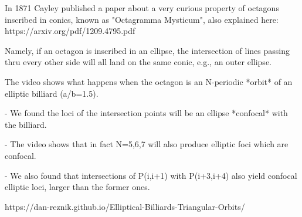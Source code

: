 In 1871 Cayley published a paper about a very curious property of octagons inscribed in conics, known as "Octagramma Mysticum", also explained here: https://arxiv.org/pdf/1209.4795.pdf

Namely, if an octagon is inscribed in an ellipse, the intersection of lines passing thru every other side will all land on the same conic, e.g., an outer ellipse. 

The video shows what happens when the octagon is an N-periodic *orbit* of an elliptic billiard (a/b=1.5).

- We found the loci of the intersection points will be an ellipse *confocal* with the billiard.

- The video shows that in fact N=5,6,7 will also produce elliptic foci which are confocal.

- We also found that intersections of  P(i,i+1) with P(i+3,i+4) also yield confocal elliptic loci, larger than the former ones.

https://dan-reznik.github.io/Elliptical-Billiards-Triangular-Orbits/